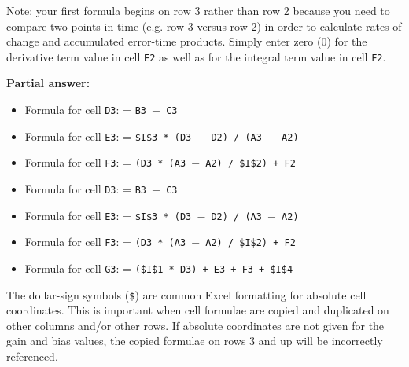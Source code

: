 Note: your first formula begins on row 3 rather than row 2 because you need to compare two points in time (e.g. row 3 versus row 2) in order to calculate rates of change and accumulated error-time products.  Simply enter zero (0) for the derivative term value in cell {\tt E2} as well as for the integral term value in cell {\tt F2}.







\noindent
{\bf Partial answer:}

\begin{itemize}
\item{} Formula for cell {\tt D3}: = {\tt B3 $-$ C3}
\vskip 10pt
\item{} Formula for cell {\tt E3}: = {\tt \$I\$3 * (D3 $-$ D2) / (A3 $-$ A2)}
\vskip 10pt
\item{} Formula for cell {\tt F3}: = {\tt (D3 * (A3 $-$ A2) / \$I\$2) + F2}
\end{itemize}







\begin{itemize}
\item{} Formula for cell {\tt D3}: = {\tt B3 $-$ C3}
\vskip 10pt
\item{} Formula for cell {\tt E3}: = {\tt \$I\$3 * (D3 $-$ D2) / (A3 $-$ A2)}
\vskip 10pt
\item{} Formula for cell {\tt F3}: = {\tt (D3 * (A3 $-$ A2) / \$I\$2) + F2}
\vskip 10pt
\item{} Formula for cell {\tt G3}: = {\tt (\$I\$1 * D3) + E3 + F3 + \$I\$4}
\end{itemize}

The dollar-sign symbols ({\tt \$}) are common Excel formatting for absolute cell coordinates.  This is important when cell formulae are copied and duplicated on other columns and/or other rows.  If absolute coordinates are not given for the gain and bias values, the copied formulae on rows 3 and up will be incorrectly referenced.





